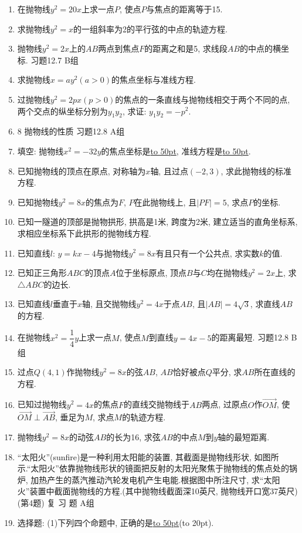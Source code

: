 \documentclass[10pt,a4paper]{article}
\newcommand{\blank}[1]{\underline{\hbox to #1pt{}}}
\newcommand{\bracket}[1]{(\hbox to #1pt{})}
\begin{document}
\begin{enumerate}[1.]
\item 在抛物线$y^2=20x$上求一点$P$, 使点$P$与焦点的距离等于15.
\item 求抛物线$y^2=x$的一组斜率为2的平行弦的中点的轨迹方程.
\item 抛物线$y^2=2x$上的$AB$两点到焦点$F$的距离之和是5, 求线段$AB$的中点的横坐标.
习题12.7  B组
\item 求抛物线$x=ay^2(a>0)$的焦点坐标与准线方程.
\item 过抛物线$y^2=2px(p>0)$的焦点的一条直线与抛物线相交于两个不同的点, 两个交点的纵坐标分别为$y_1y_2$, 求证: $y_1y_2=-p^2$.
\item 8  抛物线的性质
习题12.8  A组
\item 填空:
抛物线$x^2=-32y$的焦点坐标是\blank{50}, 准线方程是\blank{50}.
\item 已知抛物线的顶点在原点, 对称轴为$x$轴, 且过点$(-2,3)$, 求此抛物线的标准方程.
\item 已知抛物线$y^2=8x$的焦点为$F$, $P$在此抛物线上, 且$|PF|=5$, 求点$P$的坐标.
\item 已知一隧道的顶部是抛物拱形, 拱高是1米, 跨度为2米, 建立适当的直角坐标系, 求相应坐标系下此拱形的抛物线方程.
\item 已知直线$l$: $y=kx-4$与抛物线$y^2=8x$有且只有一个公共点, 求实数$k$的值.
\item 已知正三角形$ABC$的顶点$A$位于坐标原点, 顶点$B$与$C$均在抛物线$y^2=2x$上, 求$\triangle ABC$的边长.
\item 已知直线$l$垂直于$x$轴, 且交抛物线$y^2=4x$于点$AB$, 且$|AB|=4\sqrt 3$, 求直线$AB$的方程.
\item 在抛物线$x^2=\dfrac 14y$上求一点$M$, 使点$M$到直线$y=4x-5$的距离最短.
习题12.8  B组
\item 过点$Q(4,1)$作抛物线$y^2=8x$的弦$AB$, $AB$恰好被点$Q$平分, 求$AB$所在直线的方程.
\item 已知过抛物线$y^2=4x$的焦点$F$的直线交抛物线于$AB$两点, 过原点$O$作$\overrightarrow {OM}$, 使$\overrightarrow {OM}\perp \overrightarrow {AB}$, 垂足为$M$, 求点$M$的轨迹方程.
\item 抛物线$y^2=8x$的动弦$AB$的长为16, 求弦$AB$的中点$M$到$y$轴的最短距离.
\item ``太阳火''(sunfire)是一种利用太阳能的装置, 其截面是抛物线形状, 如图所示.``太阳火''依靠抛物线形状的镜面把反射的太阳光聚焦于抛物线的焦点处的锅炉, 加热产生的蒸汽推动汽轮发电机产生电能.根据图中所注尺寸, 求``太阳火''装置中截面抛物线的方程.(其中抛物线截面深10英尺, 抛物线开口宽37英尺)
(第4题)
复 习 题
A组
\item 选择题:
(1)下列四个命题中, 正确的是\blank{50}\bracket{20}.

\end{enumerate}
\end{document}
